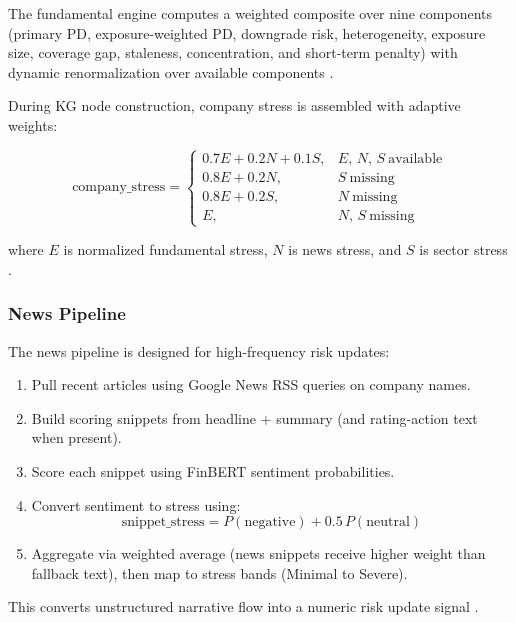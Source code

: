 The fundamental engine computes a weighted composite over nine components (primary PD, exposure-weighted PD, downgrade risk, heterogeneity, exposure size, coverage gap, staleness, concentration, and short-term penalty) with dynamic renormalization over available components \cite{ref11}.

During KG node construction, company stress is assembled with adaptive weights:

\begin{equation}
  \text{company\_stress} =
  \begin{cases}
    0.7E + 0.2N + 0.1S, & E,\,N,\,S\ \text{available}\\
    0.8E + 0.2N,         & S\ \text{missing}\\
    0.8E + 0.2S,         & N\ \text{missing}\\
    E,                   & N,\,S\ \text{missing}
  \end{cases}
\end{equation}

where $E$ is normalized fundamental stress, $N$ is news stress, and $S$ is sector stress \cite{ref12}.

\subsubsection{News Pipeline}

The news pipeline is designed for high-frequency risk updates:

\begin{enumerate}
  \item Pull recent articles using Google News RSS queries on company names.
  \item Build scoring snippets from headline + summary (and rating-action text when present).
  \item Score each snippet using FinBERT sentiment probabilities.
  \item Convert sentiment to stress using:
        \begin{equation}
          \text{snippet\_stress} = P(\text{negative}) + 0.5\,P(\text{neutral})
        \end{equation}
  \item Aggregate via weighted average (news snippets receive higher weight than fallback text), then map to stress bands (Minimal to Severe).
\end{enumerate}

This converts unstructured narrative flow into a numeric risk update signal \cite{ref13}.

